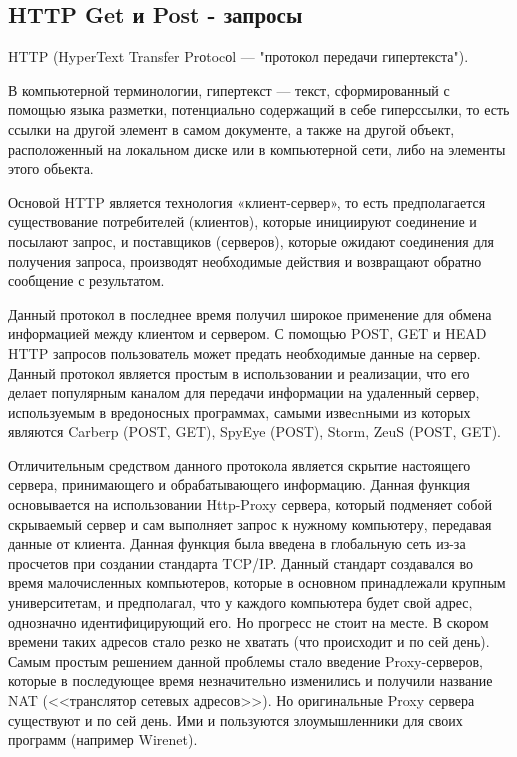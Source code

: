 \subsection{HTTP Get и Post - запросы}

HTTP (HyperText Transfer Prоtocоl — "протокол передачи гипертекста"). 

В компьютерной терминологии, гипертекст — текст, сформированный с помощью языка разметки, потенциально содержащий в себе гиперссылки, то есть ссылки на другой элемент в самом документе, а также на другой объект, расположенный на локальном диске или в компьютерной сети, либо на элементы этого обьекта.

Основой HTTP является технология «клиент-сервер», то есть предполагается существование потребителей (клиентов), которые инициируют соединение и посылают запрос, и поставщиков (серверов), которые ожидают соединения для получения запроса, производят необходимые действия и возвращают обратно сообщение с результатом.

Данный протокол в последнее время получил широкое применение для обмена информацией между клиентом и сервером. С помощью POST, GET и HEAD HTTP запросов пользователь может предать необходимые данные на сервер. Данный протокол является простым в использовании и реализации, что его делает популярным каналом для передачи информации на удаленный сервер, используемым в вредоносных программах, самыми извеcnными из которых являются Carberp (POST, GET), SpyEye (POST), Storm, ZeuS (POST, GET).

Отличительным средством данного протокола является скрытие настоящего сервера, принимающего и обрабатывающего информацию. Данная функция основывается на использовании Http-Proxy сервера, который подменяет собой скрываемый сервер и сам выполняет запрос к нужному компьютеру, передавая данные от клиента. Данная функция была введена в глобальную сеть из-за просчетов при создании стандарта TCP/IP. Данный стандарт создавался во время малочисленных компьютеров, которые в основном принадлежали крупным университетам, и предполагал, что у каждого компьютера будет свой адрес, однозначно идентифицирующий его. Но прогресс не стоит на месте. В скором времени таких адресов стало резко не хватать (что происходит и по сей день). Самым простым решением данной проблемы стало введение Proxy-серверов, которые в последующее время незначительно изменились и получили название NAT (<<транслятор сетевых адресов>>). Но оригинальные Proxy сервера существуют и по сей день. Ими и пользуются злоумышленники для своих программ (например Wirenet).